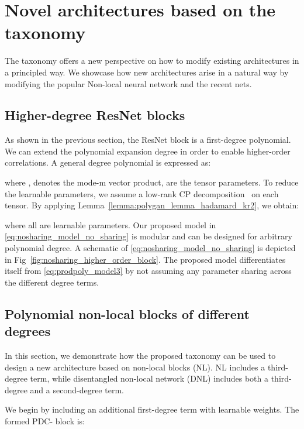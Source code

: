 \documentclass[runningheads]{llncs}
\newcommand{\resnet}{ResNet}
\newcommand{\noshare}{PDC}
\begin{document}
\section{Novel architectures based on the taxonomy}
\label{sec:nosharing_new_architectures}
The taxonomy offers a new perspective on how to modify existing architectures in a principled way. We showcase how new architectures arise in a natural way by modifying the popular Non-local neural network and the recent nets. 


\subsection{Higher-degree \resnet{} blocks}
\label{ssec:nosharing_pi_net_nosharing}
As shown in the previous section, the \resnet{} block is a first-degree polynomial. We can extend the polynomial expansion degree in order to enable higher-order correlations. 
A general degree polynomial is expressed as: 


where ,  denotes the mode-m vector product,  are the tensor parameters. To reduce the learnable parameters, we assume a low-rank CP decomposition~\cite{kolda2009tensor} on each tensor. By applying Lemma~\ref{lemma:polygan_lemma_hadamard_kr2}, we obtain: 

where all  are learnable parameters. Our proposed model in \eqref{eq:nosharing_model_no_sharing} is modular and can be designed for arbitrary polynomial degree. A schematic of \eqref{eq:nosharing_model_no_sharing} is depicted in Fig~\ref{fig:nosharing_higher_order_block}. The proposed model differentiates itself from \eqref{eq:prodpoly_model3} by not assuming any parameter sharing across the different degree terms. 







\subsection{Polynomial non-local blocks of different degrees}
\label{ssec:nosharing_nonlocal_different_degrees}

In this section, we demonstrate how the proposed taxonomy can be used to design a new architecture based on non-local blocks (NL). 
NL includes a third-degree term, while disentangled non-local network (DNL) includes both a third-degree and a second-degree term. 

We begin by including an additional first-degree term with learnable weights. The formed \noshare- block is:
\end{document}
